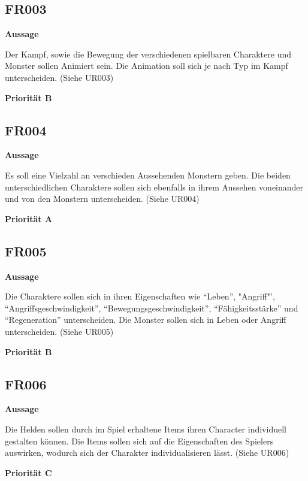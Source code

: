     \subsection{FR003}
        \hspace*{10mm} \textbf{Aussage} 
            \begin{addmargin}{20mm}
                Der Kampf, sowie die Bewegung der verschiedenen spielbaren Charaktere und Monster sollen Animiert sein. Die Animation soll sich je nach Typ im Kampf unterscheiden.  (Siehe UR003)
            \end{addmargin}
        \hspace*{10mm} \textbf{Priorität B}
    \subsection{FR004}
        \hspace*{10mm} \textbf{Aussage} 
            \begin{addmargin}{20mm}
                Es soll eine Vielzahl an verschieden Aussehenden Monstern geben. Die beiden unterschiedlichen Charaktere sollen sich ebenfalls in ihrem Aussehen voneinander und von den Monstern unterscheiden. (Siehe UR004)
            \end{addmargin}
        \hspace*{10mm} \textbf{Priorität A}
    \subsection{FR005}
        \hspace*{10mm} \textbf{Aussage} 
            \begin{addmargin}{20mm}
                Die Charaktere sollen sich in ihren Eigenschaften wie "`Leben"', "Angriff"', "`Angriffsgeschwindigkeit"', "`Bewegungsgeschwindigkeit"', "`Fähigkeitsstärke"' und "`Regeneration"' unterscheiden. Die Monster sollen sich in Leben oder Angriff unterscheiden. (Siehe UR005)
            \end{addmargin}
        \hspace*{10mm} \textbf{Priorität B}
    \subsection{FR006}
        \hspace*{10mm} \textbf{Aussage} 
            \begin{addmargin}{20mm}
                Die Helden sollen durch im Spiel erhaltene Items ihren Character individuell gestalten können. Die Items sollen sich auf die Eigenschaften des Spielers auswirken, wodurch sich der Charakter individualisieren lässt. (Siehe UR006)
            \end{addmargin}
        \hspace*{10mm} \textbf{Priorität C}
